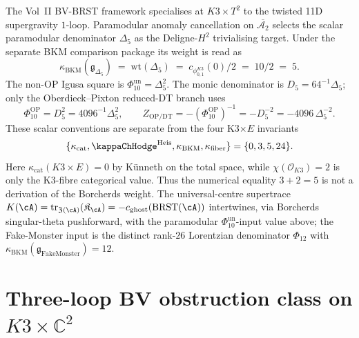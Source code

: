 \begin{remark}
\label{rem:vol2-bvbrst-paramodular}
The Vol~II BV-BRST framework specialises at $K3 \times T^2$ to the
twisted 11D supergravity $1$-loop. Paramodular anomaly cancellation on
$\overline{\mathcal{A}_2}$ selects the scalar paramodular denominator
$\Delta_5$ as the Deligne-$H^2$ trivialising target. Under the separate
BKM comparison package its weight is read as
\[
 \kappa_{\mathrm{BKM}}(\mathfrak g_{\Delta_5})
 \;=\;
 \mathrm{wt}(\Delta_5)
 \;=\;
 c_{\phi_{0,1}^{K3}}(0)/2
 \;=\;
 10/2
 \;=\;
 5 .
\]
The non-OP Igusa square is
\(\Phi_{10}^{\mathrm{un}}=\Delta_5^2\).  The monic denominator is
\(D_5=64^{-1}\Delta_5\); only the Oberdieck--Pixton reduced-DT branch
uses
\[
 \Phi_{10}^{\mathrm{OP}}=D_5^2=4096^{-1}\Delta_5^2,\qquad
 Z_{\mathrm{OP/DT}}=-(\Phi_{10}^{\mathrm{OP}})^{-1}
 =-D_5^{-2}=-4096\,\Delta_5^{-2}.
\]
These scalar conventions are separate from the four K3$\times E$
invariants
\[
 \{\kappa_{\mathrm{cat}},{\kappaChHodge}^{\mathrm{Heis}},
 \kappa_{\mathrm{BKM}},\kappa_{\mathrm{fiber}}\}
 =
 \{0,3,5,24\}.
\]
Here \(\kappa_{\mathrm{cat}}(K3\times E)=0\) by K\"unneth on the total
space, while \(\chi(\mathcal O_{K3})=2\) is only the K3-fibre
categorical value.  Thus the numerical equality \(3+2=5\) is not a
derivation of the Borcherds weight.  The universal-centre supertrace
\(K(\cA)=\mathrm{tr}_{\mathfrak Z(\cA)}(\mathfrak K_\cA)
=-c_{\mathrm{ghost}}(\mathrm{BRST}(\cA))\) intertwines, via
Borcherds singular-theta pushforward, with the paramodular
\(\Phi_{10}^{\mathrm{un}}\)-input value above; the Fake-Monster input is
the distinct rank-$26$ Lorentzian denominator \(\Phi_{12}\) with
\(\kappa_{\mathrm{BKM}}(\mathfrak g_{\mathrm{FakeMonster}})=12\).
\end{remark}

\section{Three-loop BV obstruction class on $K3\times\mathbb{C}^2$}
\label{sec:vol2-bvbrst-3loop-obstruction}

